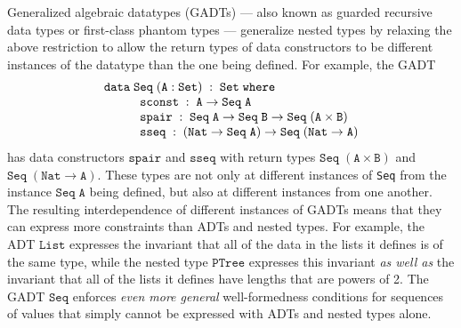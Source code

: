 \documentclass{lmcs}
\theoremstyle{plain}\newtheorem{satz}[thm]{Satz}
\begin{document}
{Generalized algebraic datatypes (GADTs) --- also known as guarded
recursive data types or first-class phantom types --- generalize
nested types by relaxing the above restriction to allow the return
types of data constructors to be different instances of the datatype
than the one being defined. For example, the GADT 
\[\begin{array}{l}
\mathtt{data\; Seq \;(A : Set)\;:\;Set\;where}\\
\hspace*{0.4in}\mathtt{sconst\;:\; A \rightarrow Seq\;A}\\
\hspace*{0.4in}\mathtt{spair\;:\;Seq\;A \rightarrow Seq\;B \rightarrow
  Seq\;(A\times B)}\\
\hspace*{0.4in}\mathtt{sseq\;:\;(Nat \rightarrow Seq\;A) \rightarrow
  Seq\;(Nat \to A)}
\end{array}\]
\noindent
\!\!has data constructors $\mathtt{spair}$ and $\mathtt{sseq}$ with
return types $\mathtt{Seq\; (A \times B)}$ and $\mathtt{Seq\;(Nat \to
  A)}$. These types are not only at different instances of \verb|Seq|
from the instance $\mathtt{Seq\; A}$ being defined, but also at
different instances from one another. The resulting interdependence of
different instances of GADTs means that they can express more
constraints than ADTs and nested types. For example, the ADT
$\mathtt{List}$ expresses the invariant that all of the data in the
lists it defines is of the same type, while the nested type
$\mathtt{PTree}$ expresses this invariant {\em as well as} the
invariant that all of the lists it defines have lengths that are
powers of 2. The GADT $\mathtt{Seq}$ enforces {\em even more general}
well-formedness conditions for sequences of values that simply cannot
be expressed with ADTs and nested types alone.

}
\end{document}
